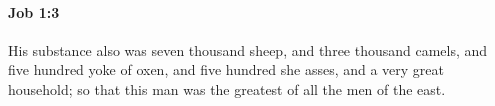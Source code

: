 
		\paragraph{Job 1:3} %
			\label{JOB-1-3}

			His substance also was seven thousand sheep, and three thousand camels, and five hundred yoke of oxen, and five hundred she asses, and a very great household; so that this man was the greatest of all the men of the east.


